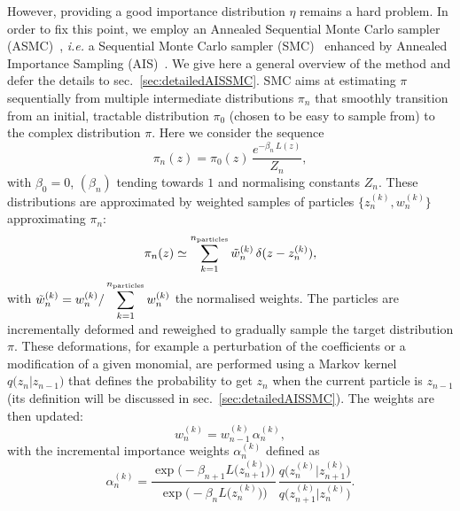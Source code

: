 \documentclass[11pt,a4paper]{article}
\begin{document}
	However, providing a good importance distribution $\eta$ remains a hard problem. In order to fix this point, we employ an Annealed Sequential Monte Carlo sampler (ASMC)~\cite{zimmermann2021nested,syed2024optimisedannealedsequentialmonte}, \textit{i.e.} a Sequential Monte Carlo sampler (SMC)~\cite{del2006sequential,DoucetTutorial,naesseth2024elementssequentialmontecarlo} enhanced by Annealed Importance Sampling (AIS)~\cite{neal1998annealedimportancesampling}. We give here a general overview of the method and defer the details to sec.~\ref{sec:detailedAISSMC}. SMC aims at estimating $\pi$ sequentially from multiple intermediate distributions $\pi_{n}$ that smoothly transition from an initial, tractable distribution $\pi_{0}$ (chosen to be easy to sample from) to the complex distribution $\pi$. Here we consider the sequence
	\begin{equation}
		\pi_{n}(z) = \pi_{0}(z)\,\frac{e^{-\beta_{n}\,L(z)}}{Z_{n}},
	\end{equation}
	with $\beta_{0}=0$, $(\beta_{n})$ tending towards $1$ and normalising constants $Z_{n}$. These distributions are approximated by weighted samples of particles $\big\{z^{(k)}_{n},w^{(k)}_{n}\big\}$ approximating $\pi_{n}$:
	\begin{equation} \label{eq:pifromweights}
		\pi_{n}(z) \simeq \sum_{k=1}^{n_{\rm particles}} \tilde{w}^{(k)}_{n}\,\delta(z-z^{(k)}_{n}),
	\end{equation}
	with  $\displaystyle \tilde{w}^{(k)}_n  = w^{(k)}_n/\sum_{k=1}^{n_{\rm particles}} w^{(k)}_{n}$ the normalised weights. The particles are incrementally deformed and reweighed to gradually sample the target distribution $\pi$. These deformations, for example a perturbation of the coefficients or a modification of a given monomial, are performed using a Markov kernel $q\big(z_{n}\vert z_{n-1}\big)$ that defines the probability to get $z_{n}$ when the current particle is $z_{n-1}$ (its definition will be discussed in sec.~\ref{sec:detailedAISSMC}). The weights are then updated:
	\begin{equation}
		w_{n}^{(k)} = w_{n-1}^{(k)}\,\alpha_{n}^{(k)},
	\end{equation}
	with the incremental importance weights $\alpha_{n}^{(k)}$ defined as
	\begin{equation}
			\alpha^{(k)}_{n} = \frac{\exp\Big(-\beta_{n+1}L\big(z_{n+1}^{(k)}\big)\Big)}{\exp\Big(-\beta_{n}L\big(z_{n}^{(k)}\big)\Big)}\,\frac{q\big(z^{(k)}_{n}\vert z^{(k)}_{n+1}\big)}{q\big(z^{(k)}_{n+1}\vert z^{(k)}_{n}\big)}.
	\end{equation}
\end{document}
